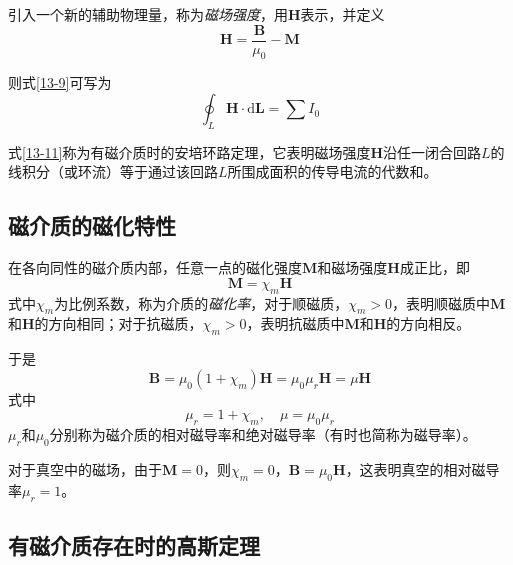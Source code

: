 \documentclass[
	12pt, %
	a4paper, %
]{myLegrandOrangeBook}
\newcommand{\rmd}{\mathrm{d}}
\begin{document}
\begin{definition}[磁化强度]
    引入一个新的辅助物理量，称为\emph{磁场强度}，用\(\boldsymbol{H}\)表示，并定义
    \begin{equation}
        \boldsymbol{H} = \frac{\boldsymbol{B}}{\mu_0} - \boldsymbol{M}
    \end{equation}
\end{definition}
\begin{theorem}[有磁介质时的安培环路定理]
    则式\ref{13-9}可写为
    \begin{equation}
        \oint_L \boldsymbol{H} \cdot \rmd \boldsymbol{L} = \sum I_0
        \label{13-11}
    \end{equation}
\end{theorem}

式\ref{13-11}称为有磁介质时的安培环路定理，它表明磁场强度\(\boldsymbol{H}\)沿任一闭合回路\(L\)的线积分（或环流）等于通过该回路\(L\)所围成面积的传导电流的代数和。

\subsection{磁介质的磁化特性}

在各向同性的磁介质内部，任意一点的磁化强度\(\boldsymbol{M}\)和磁场强度\(\boldsymbol{H}\)成正比，即
\begin{equation}
    \boldsymbol{M} = \chi_m \boldsymbol{H}
\end{equation}
式中\(\chi_m\)为比例系数，称为介质的\emph{磁化率}，对于顺磁质，\(\chi_m > 0\)，表明顺磁质中\(\boldsymbol{M}\)和\(\boldsymbol{H}\)的方向相同；对于抗磁质，\(\chi_m > 0\)，表明抗磁质中\(\boldsymbol{M}\)和\(\boldsymbol{H}\)的方向相反。

于是
\begin{equation}
    \boldsymbol{B} = \mu_0 (1 + \chi_m)\boldsymbol{H} = \mu_0 \mu_r \boldsymbol{H}= \mu \boldsymbol{H}
\end{equation}
式中
\begin{equation}
    \mu_r = 1 + \chi_m, \quad \mu = \mu_0\mu_r
\end{equation}
\(\mu_r\)和\(\mu_0\)分别称为磁介质的相对磁导率和绝对磁导率（有时也简称为磁导率）。

对于真空中的磁场，由于\(\boldsymbol{M} = 0\)，则\(\chi_m = 0\)，\(\boldsymbol{B} = \mu_0 \boldsymbol{H}\)，这表明真空的相对磁导率\(\mu_r = 1\)。

\subsection{有磁介质存在时的高斯定理}
\end{document}
